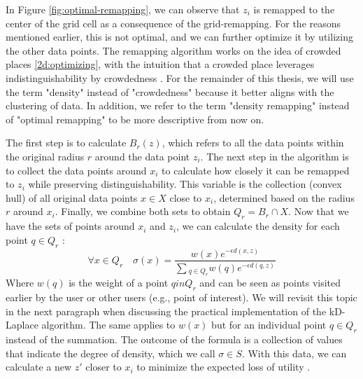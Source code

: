 In Figure \ref{fig:optimal-remapping}, we can observe that $z_i$ is remapped to the center of the grid cell as a consequence of the grid-remapping.
For the reasons mentioned earlier, this is not optimal, and we can further optimize it by utilizing the other data points.
The remapping algorithm works on the idea of crowded places \ref{2d:optimizing}, with the intuition that a crowded place leverages indistinguishability by crowdedness \citep{chatzikokolakis_efficient_2017}.
For the remainder of this thesis, we will use the term "density" instead of "crowdedness" because it better aligns with the clustering of data.
In addition, we refer to the term "density remapping" instead of "optimal remapping" to be more descriptive from now on.

The first step is to calculate $B_r(z)$, which refers to all the data points within the original radius $r$ around the data point $z_i$.
The next step in the algorithm is to collect the data points around $x_i$ to calculate how closely it can be remapped to $z_i$ while preserving distinguishability.
This variable is the collection (convex hull) of all original data points $x \in X$ close to $x_i$, determined based on the radius $r$ around $x_i$.
Finally, we combine both sets to obtain $Q_r = B_r \cap X$.
Now that we have the sets of points around $x_i$ and $z_i$, we can calculate the density for each point $q \in Q_r$ \citep{chatzikokolakis_efficient_2017}:
\begin{equation}
  \forall x \in Q_r \quad \sigma(x) = \frac{w(x)e^{-\epsilon d(x, z)}}{\sum{_{q\in Q_r} w(q)e^{-\epsilon d(q, z)}}}
  \label{eq:optimal-remapping-formula-1}
\end{equation}
Where $w(q)$ is the weight of a point $q in Q_r$ and can be seen as points visited earlier by the user or other users (e.g., point of interest).
We will revisit this topic in the next paragraph when discussing the practical implementation of the kD-Laplace algorithm.
The same applies to $w(x)$ but for an individual point $q \in Q_r$ instead of the summation.
The outcome of the formula is a collection of values that indicate the degree of density, which we call $\sigma \in S$.
With this data, we can calculate a new $z'$ closer to $x_i$ to minimize the expected loss of utility \citep{chatzikokolakis_efficient_2017}.

